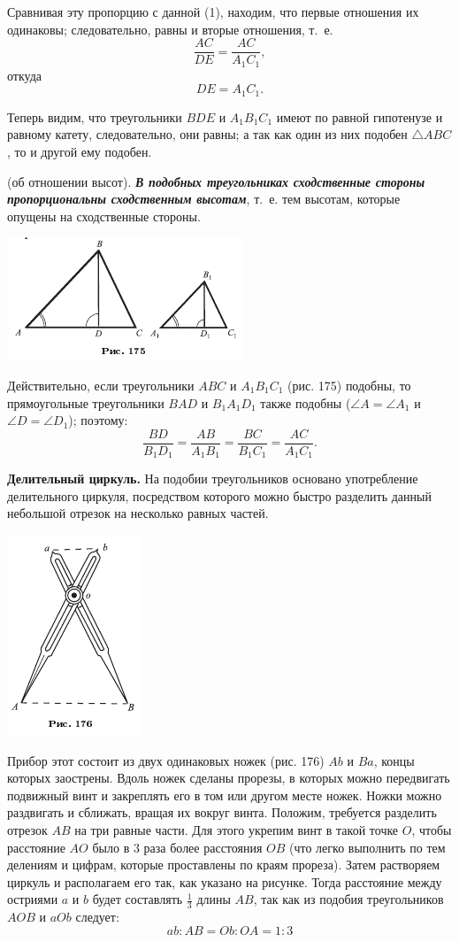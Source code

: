 \documentclass[oneside]{book}
\begin{document}
Сравнивая эту пропорцию с данной (1), находим, что первые отношения их одинаковы;
следовательно, равны и вторые отношения, т.~е. 
\[\frac{AC}{DE}=\frac{AC}{A_1C_1},\]
откуда
\[DE=A_1C_1.\]

Теперь видим, что треугольники $BDE$ и $A_1B_1C_1$ имеют по равной гипотенузе и равному катету, следовательно, они равны;
а так как один из них подобен $\triangle ABC$, то и другой ему подобен.

 (об отношении высот).
\textbf{\emph{В подобных треугольниках сходственные стороны пропорциональны сходственным высотам}}, т.~е. тем высотам, которые опущены на сходственные стороны.

\includegraphics{pics/ris-175}

Действительно, если треугольники $ABC$ и $A_1B_1C_1$ (рис. 175) подобны, то прямоугольные треугольники $BAD$ и $B_1A_1D_1$ также подобны ($\angle A = \angle A_1$ и $\angle D=\angle D_1$);
поэтому:
\[\frac{BD}{B_1D_1}=\frac{AB}{A_1B_1}=\frac{BC}{B_1C_1}=\frac{AC}{A_1C_1}.\]

\textbf{Делительный циркуль.} %
На подобии треугольников основано употребление делительного циркуля, посредством которого можно быстро разделить данный небольшой отрезок на несколько равных частей.

\includegraphics{pics/ris-176}

Прибор этот состоит из двух одинаковых ножек (рис. 176) $Ab$ и $Ba$, концы которых заострены.
Вдоль ножек сделаны прорезы, в которых можно передвигать подвижный винт и закреплять его в том или другом месте ножек.
Ножки можно раздвигать и сближать, вращая их вокруг винта.
Положим, требуется разделить отрезок $AB$ на три равные части.
Для этого укрепим винт в такой точке $O$, чтобы расстояние $AO$ было в 3 раза более расстояния $OB$ (что легко выполнить по тем делениям и цифрам, которые проставлены по краям прореза).
Затем растворяем циркуль и располагаем его так, как указано на рисунке.
Тогда расстояние между остриями $a$ и $b$ будет составлять $\tfrac13$ длины $AB$, так как из подобия треугольников $AOB$ и $aOb$ следует:
\[ab:AB=Ob:OA=1:3\]
\end{document}
